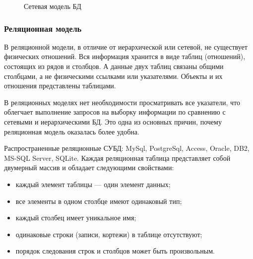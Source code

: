 \documentclass[12pt]{article}
\begin{document}
\begin{figure}[h]
	\caption{Сетевая модель БД}
	\label{fig:image}
\end{figure}

\subsubsection{Реляционная модель}
\setcounter{subsubsection}{3}

В реляционной модели, в отличие от иерархической или сетевой, не существует физических отношений. Вся информация хранится в виде таблиц (отношений), состоящих из рядов и столбцов. А данные двух таблиц связаны общими столбцами, а не физическими ссылками или указателями. Объекты и их отношения представлены таблицами.

В реляционных моделях нет необходимости просматривать все указатели, что облегчает выполнение запросов на выборку информации по сравнению с сетевыми и иерархическими БД. Это одна из основных причин, почему реляционная модель оказалась более удобна.

Распространенные реляционные СУБД: MySql, PostgreSql, Access, Oracle, DB2, MS-SQL Server, SQLite.
Каждая реляционная таблица представляет собой двумерный массив и обладает следующими свойствами:

\begin{itemize}
	\item каждый элемент таблицы — один элемент данных;
	\item все элементы в одном столбце имеют одинаковый тип;
	\item каждый столбец имеет уникальное имя;
	\item одинаковые строки (записи, кортежи) в таблице отсутствуют;
	\item порядок следования строк и столбцов может быть произвольным.
\end{itemize}
\end{document}
